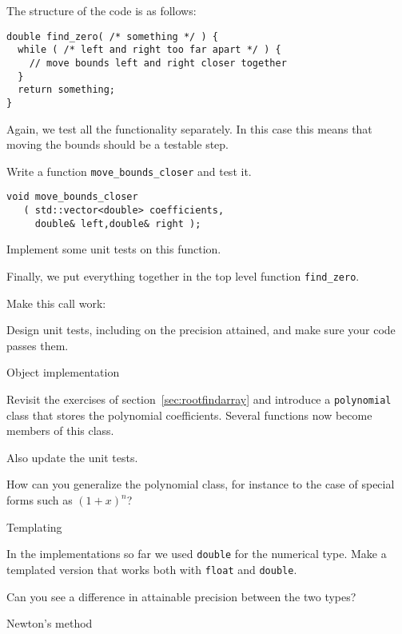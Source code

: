 The structure of the code is as follows:
\begin{lstlisting}
double find_zero( /* something */ ) {
  while ( /* left and right too far apart */ ) {
    // move bounds left and right closer together
  }
  return something;
}
\end{lstlisting}

Again, we test all the functionality separately.
In this case this means that moving the bounds
should be a testable step.

\begin{exercise}
  Write a function \lstinline+move_bounds_closer+
  and test it.
\begin{lstlisting}
void move_bounds_closer
   ( std::vector<double> coefficients,
     double& left,double& right );
\end{lstlisting}
  Implement some unit tests on this function.
\end{exercise}

Finally, we put everything together in the top level function \lstinline{find_zero}.

\begin{exercise}
  \label{ex:bisect-find}
  Make this call work:

  Design unit tests, including on the precision attained,
  and make sure your code passes them.
\end{exercise}

 {Object implementation}
\label{sec:rootfindclass}

Revisit the exercises of section~\ref{sec:rootfindarray}
and introduce a \lstinline{polynomial} class
that stores the polynomial coefficients.
Several functions now become members of this class.

Also update the unit tests.

How can you generalize the polynomial class, for instance
to the case of special forms such as $(1+x)^n$?

 {Templating}

In the implementations so far we used \lstinline{double}
for the numerical type.
Make a templated version that works both with \lstinline{float}
and \lstinline{double}.

Can you see a difference in attainable precision
between the two types?

 {Newton's method}
\label{sec:newton}


